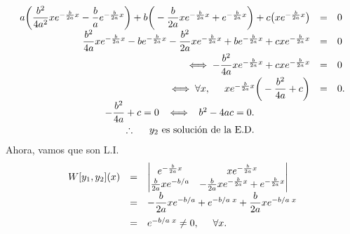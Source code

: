 \documentclass{beamer}
\begin{document}
\begin{frame}[t]
	\begin{block}{}
		\footnotesize 
		\[
			\begin{array}{rcl}
				a \bigg(\dfrac{b^2}{4a^2} xe^{- \frac{b}{2a} x} - \dfrac{b}{a} e^{- \frac{b}{2a} x}\bigg) + b \bigg(- \dfrac{b}{2a} xe^{- \frac{b}{2a} x} + e^{- \frac{b}{2a} x}\bigg) +c \big(xe^{- \frac{b}{2a} x}\big) & = & 0 \\[2mm]
				\dfrac{b^2}{4a} xe^{- \frac{b}{2a} x} - b e^{- \frac{b}{2a} x} - \dfrac{b^2}{2a} xe^{- \frac{b}{2a} x} +be^{- \frac{b}{2a} x} +cx e^{- \frac{b}{2a} x} & = & 0 \\[2mm]
				\iff - \dfrac{b^2}{4a} xe^{- \frac{b}{2a} x} +cxe^{- \frac{b}{2a} x} & = & 0 \\[2mm]
				\iff \forall x, \hspace{5mm} xe^{- \frac{b}{2a} x} \bigg(- \dfrac{b^2}{4a} +c\bigg) & = & 0.\\
				- \dfrac{b^2}{4a} +c=0 \;\; \iff \;\; b^2-4ac=0. \hspace{2cm} &&\\[2mm]
				\therefore \hspace{5mm} y_2 \mbox{ es solución de la E.D.} \hspace{2cm} &&
			\end{array}
		\]
		Ahora, vamos que son L.I. \vspace{-5mm}
		\[
			\begin{array}{rcl}
				W[y_1,y_2] (x) & = & \begin{vmatrix}
					e^{- \frac{b}{2a} x} & xe^{- \frac{b}{2a} x} \\
					\frac{b}{2a} xe^{-b/a} & - \frac{b}{2a} xe^{- \frac{b}{2a} x} +e^{- \frac{b}{2a} x}
				\end{vmatrix}\\
				& = & - \dfrac{b}{2a} xe^{-b/a} +e^{-b/a\;x} + \dfrac{b}{2a} xe^{-b/a\;x} \\[3mm]
				& = & e^{-b/a\;x} \ne 0, \hspace{5mm} \forall x.
			\end{array}
		\]
	\end{block}
\end{frame}
\end{document}
